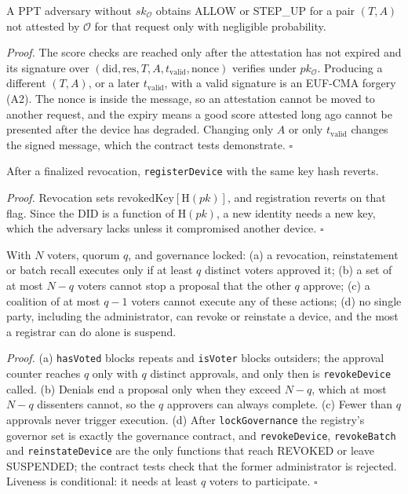\begin{proposition}\label{prop:oracle}
A PPT adversary without $sk_\mathcal{O}$ obtains ALLOW or STEP\_UP for a pair $(T,A)$ not attested by $\mathcal{O}$ for that request only with negligible probability.
\end{proposition}
\emph{Proof.} The score checks are reached only after the attestation has not expired and its signature over $(\mathrm{did},\mathrm{res},T,A,t_{\mathrm{valid}},\mathrm{nonce})$ verifies under $pk_\mathcal{O}$. Producing a different $(T,A)$, or a later $t_{\mathrm{valid}}$, with a valid signature is an EUF-CMA forgery (A2). The nonce is inside the message, so an attestation cannot be moved to another request, and the expiry means a good score attested long ago cannot be presented after the device has degraded. Changing only $A$ or only $t_{\mathrm{valid}}$ changes the signed message, which the contract tests demonstrate. \hfill$\square$

\begin{proposition}\label{prop:key}
After a finalized revocation, \texttt{registerDevice} with the same key hash reverts.
\end{proposition}
\emph{Proof.} Revocation sets $\mathrm{revokedKey}[\mathrm{H}(pk)]$, and registration reverts on that flag. Since the DID is a function of $\mathrm{H}(pk)$, a new identity needs a new key, which the adversary lacks unless it compromised another device. \hfill$\square$

\begin{proposition}\label{prop:gov}
With $N$ voters, quorum $q$, and governance locked: (a) a revocation, reinstatement or batch recall executes only if at least $q$ distinct voters approved it; (b) a set of at most $N-q$ voters cannot stop a proposal that the other $q$ approve; (c) a coalition of at most $q-1$ voters cannot execute any of these actions; (d) no single party, including the administrator, can revoke or reinstate a device, and the most a registrar can do alone is suspend.
\end{proposition}
\emph{Proof.} (a) \texttt{hasVoted} blocks repeats and \texttt{isVoter} blocks outsiders; the approval counter reaches $q$ only with $q$ distinct approvals, and only then is \texttt{revokeDevice} called. (b) Denials end a proposal only when they exceed $N-q$, which at most $N-q$ dissenters cannot, so the $q$ approvers can always complete. (c) Fewer than $q$ approvals never trigger execution. (d) After \texttt{lockGovernance} the registry's governor set is exactly the governance contract, and \texttt{revokeDevice}, \texttt{revokeBatch} and \texttt{reinstateDevice} are the only functions that reach REVOKED or leave SUSPENDED; the contract tests check that the former administrator is rejected. Liveness is conditional: it needs at least $q$ voters to participate. \hfill$\square$

